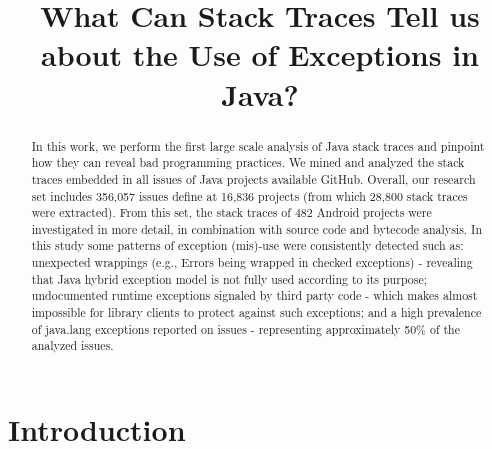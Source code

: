 \documentclass[conference]{IEEEtran}
\begin{document}
\title{What Can Stack Traces Tell us about the Use of Exceptions in Java?}

\author{
}

\newcommand{\todo}[1]{\textbf{TODO}\footnote{\textbf{TODO:} #1}}

\maketitle

\begin{abstract}

In this work, we perform the first large scale analysis of Java stack traces and
pinpoint how they can reveal bad programming practices. We mined and analyzed
the stack traces embedded in all issues of Java projects available GitHub.
Overall, our research set includes 356,057 issues define at 16,836 projects
(from which 28,800 stack traces were extracted). From this set, the stack traces
of 482 Android projects were investigated in more detail, in combination with
source code and bytecode analysis. In this study some patterns of exception
(mis)-use were consistently detected such as: unexpected wrappings (e.g., Errors
being wrapped in checked exceptions) - revealing that Java hybrid exception
model is not fully used according to its purpose;  undocumented runtime
exceptions signaled by third party code - which makes almost impossible for
library clients to protect against such exceptions; and a high prevalence of
java.lang exceptions reported on issues - representing approximately 50\% of the
analyzed issues.


\end{abstract}


\section{Introduction}
\end{document}
